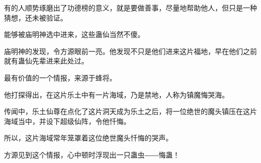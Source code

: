 \begin{this_body}
有的人顺势琢磨出了功德榜的意义，就是要做善事，尽量地帮助他人，但只是一种猜想，还未被验证。

能够被庙明神选中进来，这些蛊仙当然不傻。

庙明神的发现，令方源眼前一亮。他发现不只是他们进来这片福地，早在他们之前就有蛊仙先辈进来此处过。

最有价值的一个情报，来源于蜂将。

他打探得出，在这片乐土中有一片海域，乃是禁地，人称为镇魔悔哭海。

传闻中，乐土仙尊在点化了这片洞天成为乐土之后，将一位绝世的魔头镇压在这片海域当中，并设下超级仙阵，令他忏悔。

所以，这片海域常年笼罩着这位绝世魔头忏悔的哭声。

方源见到这个情报，心中顿时浮现出一只蛊虫――悔蛊！

\end{this_body}

